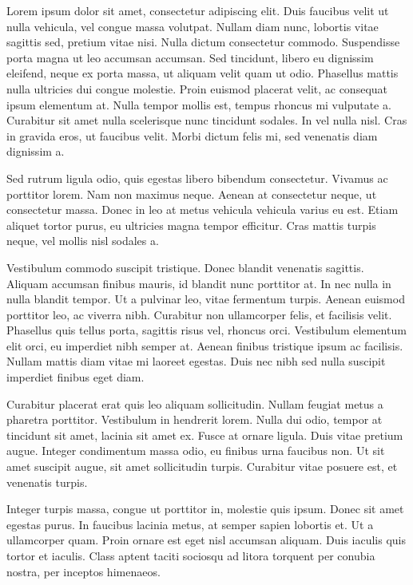 

Lorem ipsum dolor sit amet, consectetur adipiscing elit. Duis faucibus velit ut nulla vehicula, vel congue massa volutpat. Nullam diam nunc, lobortis vitae sagittis sed, pretium vitae nisi. Nulla dictum consectetur commodo. Suspendisse porta magna ut leo accumsan accumsan. Sed tincidunt, libero eu dignissim eleifend, neque ex porta massa, ut aliquam velit quam ut odio. Phasellus mattis nulla ultricies dui congue molestie. Proin euismod placerat velit, ac consequat ipsum elementum at. Nulla tempor mollis est, tempus rhoncus mi vulputate a. Curabitur sit amet nulla scelerisque nunc tincidunt sodales. In vel nulla nisl. Cras in gravida eros, ut faucibus velit. Morbi dictum felis mi, sed venenatis diam dignissim a.

Sed rutrum ligula odio, quis egestas libero bibendum consectetur. Vivamus ac porttitor lorem. Nam non maximus neque. Aenean at consectetur neque, ut consectetur massa. Donec in leo at metus vehicula vehicula varius eu est. Etiam aliquet tortor purus, eu ultricies magna tempor efficitur. Cras mattis turpis neque, vel mollis nisl sodales a.

Vestibulum commodo suscipit tristique. Donec blandit venenatis sagittis. Aliquam accumsan finibus mauris, id blandit nunc porttitor at. In nec nulla in nulla blandit tempor. Ut a pulvinar leo, vitae fermentum turpis. Aenean euismod porttitor leo, ac viverra nibh. Curabitur non ullamcorper felis, et facilisis velit. Phasellus quis tellus porta, sagittis risus vel, rhoncus orci. Vestibulum elementum elit orci, eu imperdiet nibh semper at. Aenean finibus tristique ipsum ac facilisis. Nullam mattis diam vitae mi laoreet egestas. Duis nec nibh sed nulla suscipit imperdiet finibus eget diam.

Curabitur placerat erat quis leo aliquam sollicitudin. Nullam feugiat metus a pharetra porttitor. Vestibulum in hendrerit lorem. Nulla dui odio, tempor at tincidunt sit amet, lacinia sit amet ex. Fusce at ornare ligula. Duis vitae pretium augue. Integer condimentum massa odio, eu finibus urna faucibus non. Ut sit amet suscipit augue, sit amet sollicitudin turpis. Curabitur vitae posuere est, et venenatis turpis.

Integer turpis massa, congue ut porttitor in, molestie quis ipsum. Donec sit amet egestas purus. In faucibus lacinia metus, at semper sapien lobortis et. Ut a ullamcorper quam. Proin ornare est eget nisl accumsan aliquam. Duis iaculis quis tortor et iaculis. Class aptent taciti sociosqu ad litora torquent per conubia nostra, per inceptos himenaeos. 

\bye
